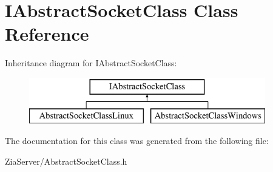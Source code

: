 \hypertarget{class_i_abstract_socket_class}{
\section{IAbstractSocketClass Class Reference}
\label{class_i_abstract_socket_class}
}
Inheritance diagram for IAbstractSocketClass:\begin{figure}[H]
\begin{center}
\leavevmode
\includegraphics[height=2.000000cm]{class_i_abstract_socket_class}
\end{center}
\end{figure}


The documentation for this class was generated from the following file:\begin{DoxyCompactItemize}
\item 
ZiaServer/AbstractSocketClass.h\end{DoxyCompactItemize}

